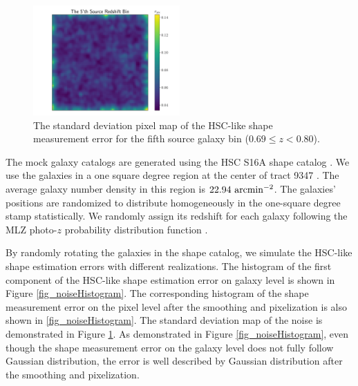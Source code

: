 \begin{figure}
 \centering
 \includegraphics[width=0.5\textwidth]{noise_std_map_pix.pdf}
 \caption{The standard deviation pixel map of the HSC-like shape measurement
     error for the fifth source galaxy bin ($0.69 \leq z < 0.80 $).
        } \label{fig_noistdmap}
\end{figure}

The mock galaxy catalogs are generated using the HSC S16A shape catalog
\citep{HSC1-catalog}.  We use the galaxies in a one square degree region at the
center of tract 9347 \citep{HSC1-data}. The average galaxy number density in
this region is $22.94~\rm{arcmin}^{-2}$. The galaxies' positions are randomized to
distribute homogeneously  in the one-square degree stamp statistically. We
randomly assign its redshift for each galaxy following the MLZ photo-$z$
probability distribution function \citep{HSC1-photoz}.

By randomly rotating the galaxies in the shape catalog, we simulate the
HSC-like shape estimation errors with different realizations.  The histogram of
the first component of the HSC-like shape estimation error on galaxy level is
shown in Figure \ref{fig_noiseHistogram}.  The corresponding histogram of the
shape measurement error on the pixel level after the smoothing and pixelization is
also shown in \ref{fig_noiseHistogram}. The standard deviation map of the
noise is demonstrated in Figure \ref{fig_noistdmap}. As demonstrated in Figure
\ref{fig_noiseHistogram}, even though the shape measurement error on the galaxy
level does not fully follow Gaussian distribution, the error is well described
by Gaussian distribution after the smoothing and pixelization.
